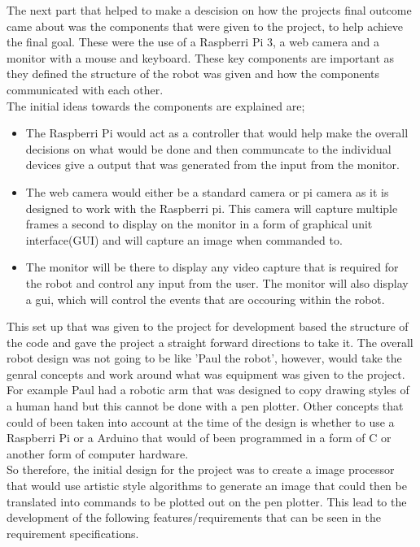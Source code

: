 \documentclass{article}
\begin{document}
The next part that helped to make a descision on how the projects final outcome came about was the components that were given to the project, to help achieve the final goal. These were the use of a Raspberri Pi 3, a web camera and a monitor with a mouse and keyboard. These key components are important as they defined the structure of the robot was given and how the components communicated with each other. \\ \newline
\clearpage
The initial ideas towards the components are explained are; \\ \newline
\begin{itemize}
  \item The Raspberri Pi would act as a controller that would help make the overall decisions on what would be done and then communcate to the individual devices give a output that was generated from the input from the monitor.
  \item The web camera would either be a standard camera or pi camera as it is designed to work with the Raspberri pi. This camera will capture multiple frames a second to display on the monitor in a form of graphical unit interface(GUI) and will capture an image when commanded to.
  \item The monitor will be there to display any video capture that is required for the robot and control any input from the user. The monitor will also display a gui, which will control the events that are occouring within the robot.
\end{itemize}

This set up that was given to the project for development based the structure of the code and gave the project a straight forward directions to take it. The overall robot design was not going to be like 'Paul the robot'\cite{Paul_the_robot}, however, would take the genral concepts and work around what was equipment was given to the project. For example Paul had a robotic arm that was designed to copy drawing styles of a human hand but this cannot be done with a pen plotter. Other concepts that could of been taken into account at the time of the design is whether to use a Raspberri Pi or a Arduino that would of been programmed in a form of C or another form of computer hardware.\\ \newline 
So therefore, the initial design for the project was to create a image processor that would use artistic style algorithms to generate an image that could then be translated into commands to be plotted out on the pen plotter. This lead to the development of the following features/requirements that can be seen in the requirement specifications\cite{Requirement_specifications}. \\ \newline  
\end{document}
